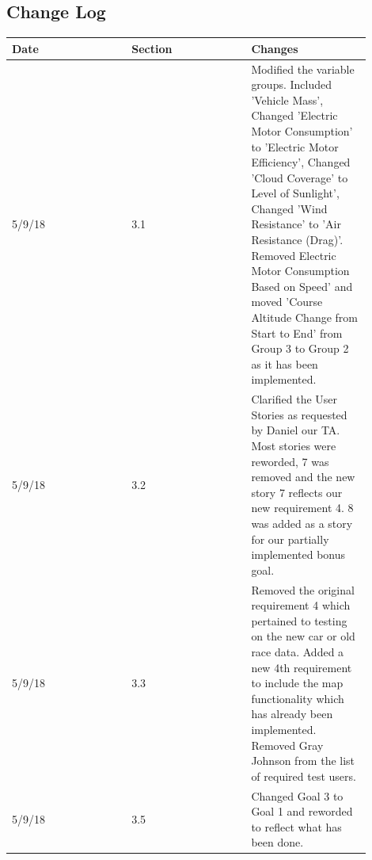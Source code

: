 \documentclass[onecolumn, draftclsnofoot,10pt, compsoc]{IEEEtran}
\begin{document}
\begin{singlespace}
\section{Change Log}

\vspace{0.5cm}
\begin{center}
\begin{tabular}{|p{0.3\linewidth}|p{0.3\linewidth}|p{0.3\linewidth}|} 
\hline
Date   & Section   & Changes   \\
\hline
5/9/18 & 3.1 & Modified the variable groups. Included 'Vehicle Mass', Changed 'Electric Motor Consumption' to 'Electric Motor Efficiency', Changed 'Cloud Coverage' to Level of Sunlight', Changed 'Wind Resistance' to 'Air Resistance (Drag)'. Removed Electric Motor Consumption Based on Speed' and moved 'Course Altitude Change from Start to End' from Group 3 to Group 2 as it has been implemented. \\
5/9/18 & 3.2 & Clarified the User Stories as requested by Daniel our TA. Most stories were reworded, 7 was removed and the new story 7 reflects our new requirement 4. 8 was added as a story for our partially implemented bonus goal.\\
5/9/18 & 3.3 & Removed the original requirement 4 which pertained to testing on the new car or old race data. Added a new 4th requirement to include the map functionality which has already been implemented. Removed Gray Johnson from the list of required test users.\\
5/9/18 & 3.5 & Changed Goal 3 to Goal 1 and reworded to reflect what has been done.  \\
\hline
\end{tabular}
\end{center}
    

\end{singlespace}
\end{document}
